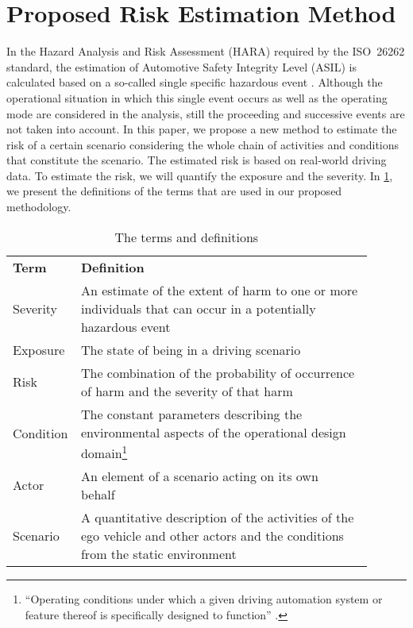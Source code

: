 \section{Proposed Risk Estimation Method}
 
In the Hazard Analysis and Risk Assessment (HARA) required by the ISO~26262 standard, the estimation of Automotive Safety Integrity Level (ASIL) is calculated based on a so-called single specific hazardous event \cite{ISO26262}.
Although the operational situation in which this single event occurs as well as the operating mode are considered in the analysis, still the proceeding and successive events are not taken into account.
In this paper, we propose a new method to estimate the risk of a certain scenario considering the whole chain of activities and conditions that constitute the scenario.
The estimated risk is based on real-world driving data. To estimate the risk, we will quantify the exposure and the severity. In \cref{Tab:Terms}, we present the definitions of the terms that are used in our proposed methodology. 

\begin{table}
	\centering
	\caption{The terms and definitions}
	\label{Tab:Terms}
	\begin{tabular}{p{0.1\linewidth} p{0.8\linewidth}}
		\toprule
		\textbf{Term} & \textbf{Definition} \\ \otoprule
		Severity & An estimate of the extent of harm to one or more individuals that can occur in a potentially hazardous event~\cite{ISO26262} \\
		Exposure & The state of being in a driving scenario \\
		Risk & The combination of the probability of occurrence of harm and the severity of that harm~\cite{ISO26262} \\ 
		Condition & The constant parameters describing the environmental aspects of the operational design domain\footnote{``Operating conditions under which a given driving automation system or feature thereof is specifically designed to function'' \cite{sea2018j3016}.} \\
		Actor & An element of a scenario acting on its own behalf~\cite{ulbrich2015} \\ 
		Scenario & A quantitative description of the activities of the ego vehicle and other actors and the conditions from the static environment \\
		\bottomrule
	\end{tabular}
\end{table}

